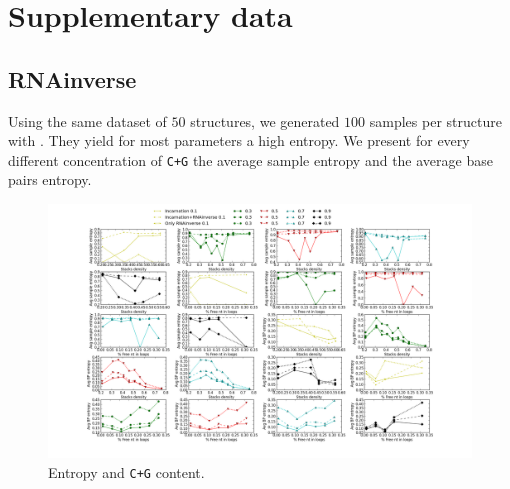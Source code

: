 \section{Supplementary data}
\subsection{RNAinverse}
Using the same dataset of $50$ structures, we generated $100$ samples
per structure with \RNAinverse. They yield for most parameters
a high entropy. We present for every different concentration of \texttt{C+G}
the average sample entropy and the average base pairs entropy.


\begin{figure}[ht!]
	\centering
	\includegraphics[scale=0.4]{Figures/RNAinverse_data_100.png}
	\caption{Entropy and \texttt{C+G} content.}
	\label{fig:rnainverse}
\end{figure}